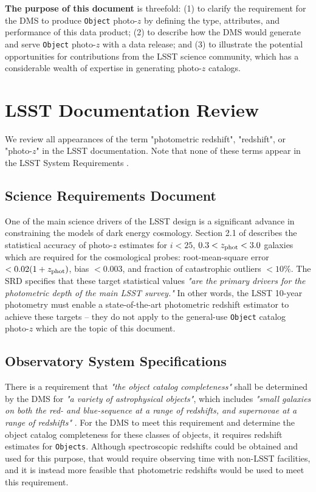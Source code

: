 \documentclass[DM,lsstdraft,toc]{lsstdoc}
\begin{document}
{\bf The purpose of this document} is threefold: (1) to clarify the requirement for the DMS to produce {\tt Object} photo-$z$ by defining the type, attributes, and performance of this data product; (2) to describe how the DMS would generate and serve {\tt Object} photo-$z$ with a data release; and (3) to illustrate the potential opportunities for contributions from the LSST science community, which has a considerable wealth of expertise in generating photo-$z$ catalogs.


\clearpage
\section{LSST Documentation Review}\label{sec:docs}

We review all appearances of the term "photometric redshift", "redshift", or "photo-$z$" in the LSST documentation. Note that none of these terms appear in the LSST System Requirements .

\subsection{Science Requirements Document}\label{ssec:docs_srd}

One of the main science drivers of the LSST design is a significant advance in constraining the models of dark energy cosmology. 
Section 2.1 of  describes the statistical accuracy of photo-$z$ estimates for $i<25$, $0.3<z_{\rm phot}<3.0$ galaxies which are required for the cosmological probes: root-mean-square error $<0.02(1+z_{\rm phot})$, bias $<0.003$, and fraction of catastrophic outliers $<10\%$.
The SRD specifies that these target statistical values {\it "are the primary drivers for the photometric depth of the main LSST survey."} 
In other words, the LSST 10-year photometry must enable a state-of-the-art photometric redshift estimator to achieve these targets -- they do not apply to the general-use {\tt Object} catalog photo-$z$ which are the topic of this document.

\subsection{Observatory System Specifications}\label{ssec:docs_oss}

There is a requirement that {\it "the object catalog completeness"} shall be determined by the DMS for {\it "a variety of astrophysical objects"}, which includes {\it "small galaxies on both the red- and blue-sequence at a range of redshifts, and supernovae at a range of redshifts"} . 
For the DMS to meet this requirement and determine the object catalog completeness for these classes of objects, it requires redshift estimates for {\tt Objects}.
Although spectroscopic redshifts could be obtained and used for this purpose, that would require observing time with non-LSST facilities, and it is instead more feasible that photometric redshifts would be used to meet this requirement.
\end{document}
